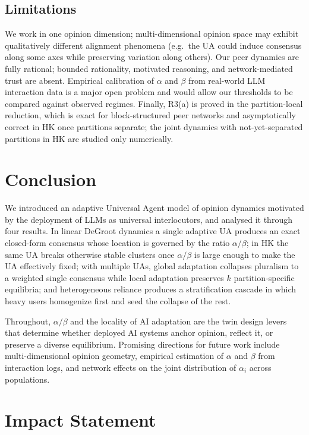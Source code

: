 \documentclass{article}
\theoremstyle{plain}
\theoremstyle{definition}
\theoremstyle{remark}
\begin{document}
\subsection{Limitations}

We work in one opinion dimension; multi-dimensional opinion space may
exhibit qualitatively different alignment phenomena (e.g.\ the UA
could induce consensus along some axes while preserving variation
along others).  Our peer dynamics are fully rational; bounded
rationality, motivated reasoning, and network-mediated trust are
absent.  Empirical calibration of $\alpha$ and $\beta$ from
real-world LLM interaction data is a major open problem and would
allow our thresholds to be compared against observed regimes.
Finally, R3(a) is proved in the partition-local reduction, which is
exact for block-structured peer networks and asymptotically correct
in HK once partitions separate; the joint dynamics with
not-yet-separated partitions in HK are studied only numerically.

\section{Conclusion}
\label{sec:conclusion}

We introduced an adaptive Universal Agent model of opinion dynamics
motivated by the deployment of LLMs as universal interlocutors, and
analysed it through four results.  In linear DeGroot dynamics a
single adaptive UA produces an exact closed-form consensus whose
location is governed by the ratio $\alpha/\beta$; in HK the same UA
breaks otherwise stable clusters once $\alpha/\beta$ is large enough
to make the UA effectively fixed; with multiple UAs, global
adaptation collapses pluralism to a weighted single consensus while
local adaptation preserves $k$ partition-specific equilibria; and
heterogeneous reliance produces a stratification cascade in which
heavy users homogenize first and seed the collapse of the rest.

Throughout, $\alpha/\beta$ and the locality of AI adaptation are the
twin design levers that determine whether deployed AI systems anchor
opinion, reflect it, or preserve a diverse equilibrium.  Promising
directions for future work include multi-dimensional opinion
geometry, empirical estimation of $\alpha$ and $\beta$ from
interaction logs, and network effects on the joint distribution of
$\alpha_i$ across populations.

\section*{Impact Statement}
\end{document}
